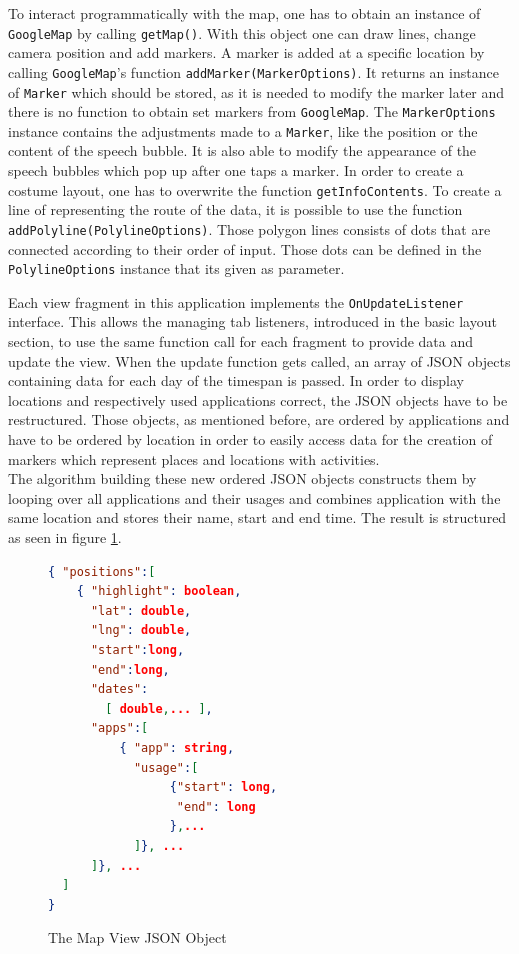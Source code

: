 To  interact programmatically with the map, one has to obtain an instance of \lstinline$GoogleMap$ by calling \lstinline$getMap()$. With this object one can draw lines, change camera position and add markers. A marker is added at a specific location by calling \lstinline$GoogleMap$'s function \lstinline$addMarker(MarkerOptions)$. It returns an instance of \lstinline$Marker$ which should be stored, as it is needed to modify the marker later and there is no function to obtain set markers from \lstinline$GoogleMap$. The \lstinline$MarkerOptions$ instance contains the adjustments made to a \lstinline$Marker$, like the position or the content of the speech bubble. It is also able to modify the appearance of the speech bubbles which pop up after one taps a marker. In order to create a costume layout, one has to overwrite the function \lstinline$getInfoContents$. To create a line of representing the route of the data, it is possible to use the function \lstinline$addPolyline(PolylineOptions)$. Those polygon lines consists of dots that are connected according to their order of input. Those dots can be defined in the \lstinline$PolylineOptions$ instance that its given as parameter.

Each  view fragment in this application implements the \lstinline$OnUpdateListener$ interface. This allows the managing tab listeners, introduced in the basic layout section, to use the same function call for each fragment to provide data and update the view.
When the update function gets called, an array of JSON objects containing data for each day of the timespan is passed. In order to display locations and respectively used applications correct, the JSON objects have to be restructured. Those objects, as mentioned before, are ordered by applications and have to be ordered by location in order to easily access data for the creation of markers which represent places and locations with activities.\\
The algorithm building these new ordered JSON objects constructs them by looping over all applications and their usages and combines application with the same location and stores their name, start and end time. The result is structured as seen in figure \ref{fig:mapsectionjson}.
\begin{figure}
\caption{The Map View JSON Object}
\label{fig:mapsectionjson}
\begin{lstlisting}[language=json,firstnumber=1]
{ "positions":[
    { "highlight": boolean,
      "lat": double,
      "lng": double,
      "start":long,
      "end":long,
      "dates":
        [ double,... ],
      "apps":[
          { "app": string,
            "usage":[
                 {"start": long,
                  "end": long
                 },...
            ]}, ...
      ]}, ...
  ]
}
\end{lstlisting}
\end{figure}

